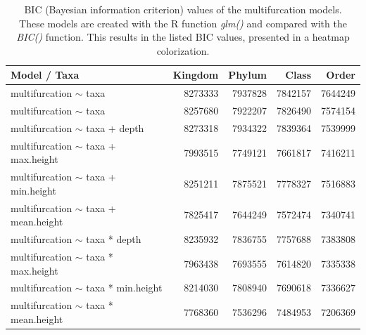       \begin{table}[h]
        \begin{center}
          \begin{tabular}{ |l|r|r|r|r| }
            \hline
            \bfseries Model / Taxa & \bfseries Kingdom & \bfseries Phylum & \bfseries Class & \bfseries Order \\
            \hline \hline
            multifurcation $\sim$ taxa & 8273333 & \cellcolor{green!15}7937828 & \cellcolor{green!20}7842157 & \cellcolor{green!30}7644249 \\
            multifurcation $\sim$ taxa & 8257680 & \cellcolor{green!15}7922207 & \cellcolor{green!20}7826490 & \cellcolor{green!35}7574154 \\
            \hline
            multifurcation $\sim$ taxa + depth & 8273318 & \cellcolor{green!15}7934322 & \cellcolor{green!20}7839364 & \cellcolor{green!35}7539999 \\
            multifurcation $\sim$ taxa + max.height & \cellcolor{green!15}7993515 & \cellcolor{green!25}7749121 & \cellcolor{green!30}7661817 & \cellcolor{green!40}7416211 \\
            multifurcation $\sim$ taxa + min.height & 8251211 & \cellcolor{green!20}7875521  & \cellcolor{green!25}7778327 & \cellcolor{green!35}7516883 \\
            multifurcation $\sim$ taxa + mean.height & \cellcolor{green!20}7825417 & \cellcolor{green!30}7644249 & \cellcolor{green!35}7572474 & \cellcolor{green!45}7340741 \\
            \hline
            multifurcation $\sim$ taxa * depth & 8235932 & \cellcolor{green!20}7836755 & \cellcolor{green!25}7757688 & \cellcolor{green!45}7383808 \\
            multifurcation $\sim$ taxa * max.height & \cellcolor{green!15}7963438 & \cellcolor{green!30}7693555 & \cellcolor{green!30}7614820 & \cellcolor{green!45}7335338 \\
            multifurcation $\sim$ taxa * min.height & 8214030 & \cellcolor{green!20}7808940 & \cellcolor{green!30}7690618 & \cellcolor{green!45}7336627\\
            multifurcation $\sim$ taxa * mean.height & \cellcolor{green!25}7768360 & \cellcolor{green!35}7536296 & \cellcolor{green!50}7484953 & \cellcolor{green!50}7206369 \\
            \hline
          \end{tabular} 
        \end{center}
        \caption{BIC (Bayesian information criterion) values of the multifurcation models. \\
          These models are created with the R function \textit{glm()} and compared with the \textit{BIC()} 
            function. This results in the listed BIC values, presented in a heatmap colorization.}
        \label{table:BIC multifurcation} 
      \end{table}
